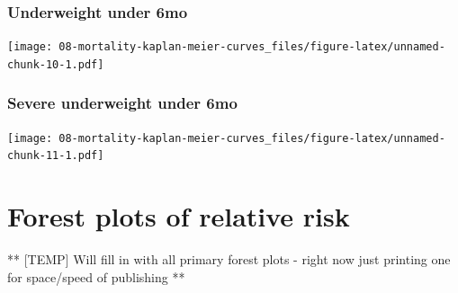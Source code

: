 \documentclass[9pt,]{book}
\begin{document}
\subsection{Underweight under 6mo}\label{underweight-under-6mo}

\texttt{[image: 08-mortality-kaplan-meier-curves\_files/figure-latex/unnamed-chunk-10-1.pdf]}

\subsection{Severe underweight under
6mo}\label{severe-underweight-under-6mo}

\texttt{[image: 08-mortality-kaplan-meier-curves\_files/figure-latex/unnamed-chunk-11-1.pdf]}

\chapter{Forest plots of relative risk}\label{RR-forest}

\raggedright

** {[}TEMP{]} Will fill in with all primary forest plots - right now
just printing one for space/speed of publishing **


\end{document}
